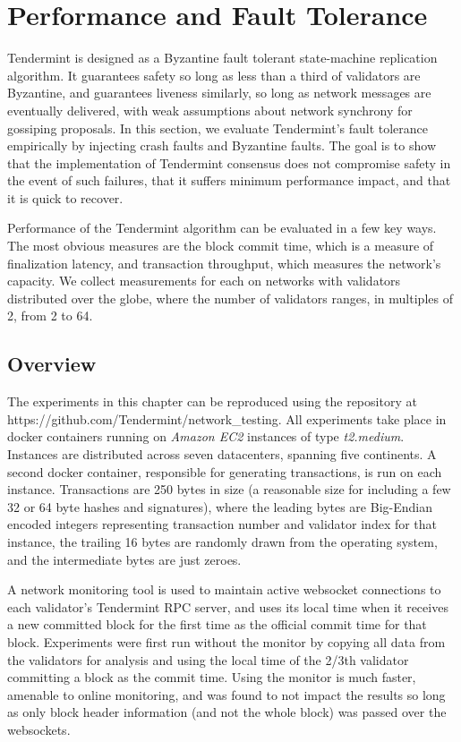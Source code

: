\chapter{Performance and Fault Tolerance}
\label{ch:performance}

Tendermint is designed as a Byzantine fault tolerant state-machine replication algorithm.
It guarantees safety so long as less than a third of validators are Byzantine, 
and guarantees liveness similarly, so long as network messages are eventually delivered,
with weak assumptions about network synchrony for gossiping proposals.
In this section, we evaluate Tendermint's fault tolerance empirically by injecting 
crash faults and Byzantine faults.
The goal is to show that the implementation of Tendermint consensus does not compromise safety in the event of such failures,
that it suffers minimum performance impact, and that it is quick to recover.

Performance of the Tendermint algorithm can be evaluated in a few key ways.
The most obvious measures are the block commit time, which is a measure of finalization latency, 
and transaction throughput, which measures the network's capacity.
We collect measurements for each on networks with validators distributed over the globe, 
where the number of validators ranges, in multiples of 2, from 2 to 64.

\section{Overview}

The experiments in this chapter can be reproduced using the repository at https://github.com/Tendermint/network\_testing.
All experiments take place in docker containers running on \emph{Amazon EC2} instances of type \emph{t2.medium}.
Instances are distributed across seven datacenters, spanning five continents.
A second docker container, responsible for generating transactions, is run on each instance.
Transactions are 250 bytes in size (a reasonable size for including a few 32 or 64 byte hashes and signatures),
where the leading bytes are Big-Endian encoded integers representing transaction number and validator index for that instance,
the trailing 16 bytes are randomly drawn from the operating system, and the intermediate bytes are just zeroes.

A network monitoring tool is used to maintain active websocket connections to each validator's Tendermint RPC server,
and uses its local time when it receives a new committed block for the first time as the official commit time for that block.
Experiments were first run without the monitor by copying all data from the validators for analysis and using the local time
of the 2/3th validator committing a block as the commit time. 
Using the monitor is much faster, amenable to online monitoring, and was found to not impact the results 
so long as only block header information (and not the whole block) was passed over the websockets.

